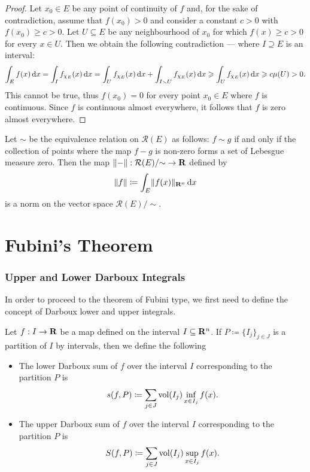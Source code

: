 \begin{proof}
    Let \(x_0 \in E\) be any point of continuity of \(f\) and, for the sake of
    contradiction, assume that \(f(x_0) > 0\) and consider a constant \(c > 0\) with
    \(f(x_0) \geq c > 0\). Let \(U \subseteq E\) be any neighbourhood of \(x_0\) for
    which \(f(x) \geq c > 0\) for every \(x \in U\). Then we obtain the following
    contradiction --- where \(I \supseteq E\) is an interval:
    \[
        \int_E f(x)\, \mathrm{d} x
        = \int_I f_{\chi_{E}}(x)\, \mathrm{d} x
        = \int_U f_{\chi_E}(x)\, \mathrm{d} x
        + \int_{I \smallsetminus U} f_{\chi_{E}}(x)\, \mathrm{d} x
        \geqslant \int_U f_{\chi_{E}}(x)\, \mathrm{d} x
        \geqslant c \mu(U) > 0.
    \]
    This cannot be true, thus \(f(x_0) = 0\) for every point \(x_0 \in E\) where
    \(f\) is continuous. Since \(f\) is continuous almost everywhere, it follows
    that \(f\) is zero almost everywhere.
\end{proof}

\begin{corollary}
    \label{cor:norm-riemann-integral}
    Let \(\sim\) be the equivalence relation on \(\mathcal R(E)\) as follows: \(f
    \sim g\) if and only if the collection of points where the map \(f - g\) is
    non-zero forms a set of Lebesgue measure zero. Then the map \(\lVert-\rVert:
    \mathcal R(E)/{\sim} \to \mathbf{R}\) defined by
    \[
        \lVert f\rVert \coloneq \int_E \lVert f(x)\rVert_{\mathbf{R}^n}\, \mathrm{d} x
    \]
    is a norm on the vector space \(\mathcal R(E)/{\sim}\).
\end{corollary}

\section{Fubini's Theorem}

\subsubsection{Upper and Lower Darboux Integrals}

In order to proceed to the theorem of Fubini type, we first need to define the
concept of Darboux lower and upper integrals.

\begin{definition}
    \label{def:darboux-sums}
    Let \(f: I \to \mathbf{R}\) be a map defined on the interval \(I \subseteq \mathbf{R}^n\). If
    \(P \coloneq \{I_{j}\}_{j \in J}\) is a partition of \(I\) by intervals, then we
    define the following
    \begin{itemize}\setlength\itemsep{0em}
        \item The lower Darboux sum of \(f\) over the interval \(I\) corresponding to
              the partition \(P\) is
              \[
                  s(f, P) \coloneq \sum_{j \in J} \operatorname{vol}(I_j) \inf_{x \in I_j} f(x).
              \]
        \item The upper Darboux sum of \(f\) over the interval \(I\) corresponding to
              the partition \(P\) is
              \[
                  S(f, P) \coloneq \sum_{j \in J} \operatorname{vol}(I_j) \sup_{x \in I_j} f(x).
              \]
    \end{itemize}
\end{definition}


